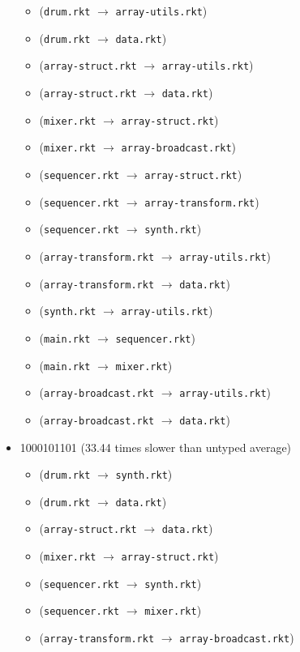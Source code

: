 \documentclass{article}
\newcommand{\mono}[1]{\texttt{#1}}
\begin{document}
\begin{itemize}
  \begin{itemize}
  \item (\mono{drum.rkt} $\rightarrow$ \mono{array-utils.rkt})
  \item (\mono{drum.rkt} $\rightarrow$ \mono{data.rkt})
  \item (\mono{array-struct.rkt} $\rightarrow$ \mono{array-utils.rkt})
  \item (\mono{array-struct.rkt} $\rightarrow$ \mono{data.rkt})
  \item (\mono{mixer.rkt} $\rightarrow$ \mono{array-struct.rkt})
  \item (\mono{mixer.rkt} $\rightarrow$ \mono{array-broadcast.rkt})
  \item (\mono{sequencer.rkt} $\rightarrow$ \mono{array-struct.rkt})
  \item (\mono{sequencer.rkt} $\rightarrow$ \mono{array-transform.rkt})
  \item (\mono{sequencer.rkt} $\rightarrow$ \mono{synth.rkt})
  \item (\mono{array-transform.rkt} $\rightarrow$ \mono{array-utils.rkt})
  \item (\mono{array-transform.rkt} $\rightarrow$ \mono{data.rkt})
  \item (\mono{synth.rkt} $\rightarrow$ \mono{array-utils.rkt})
  \item (\mono{main.rkt} $\rightarrow$ \mono{sequencer.rkt})
  \item (\mono{main.rkt} $\rightarrow$ \mono{mixer.rkt})
  \item (\mono{array-broadcast.rkt} $\rightarrow$ \mono{array-utils.rkt})
  \item (\mono{array-broadcast.rkt} $\rightarrow$ \mono{data.rkt})
  \end{itemize}
\item 1000101101 (33.44 times slower than untyped average)
  \begin{itemize}
  \item (\mono{drum.rkt} $\rightarrow$ \mono{synth.rkt})
  \item (\mono{drum.rkt} $\rightarrow$ \mono{data.rkt})
  \item (\mono{array-struct.rkt} $\rightarrow$ \mono{data.rkt})
  \item (\mono{mixer.rkt} $\rightarrow$ \mono{array-struct.rkt})
  \item (\mono{sequencer.rkt} $\rightarrow$ \mono{synth.rkt})
  \item (\mono{sequencer.rkt} $\rightarrow$ \mono{mixer.rkt})
  \item (\mono{array-transform.rkt} $\rightarrow$ \mono{array-broadcast.rkt})

\end{itemize}
\end{itemize}
\end{document}
